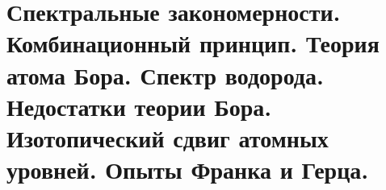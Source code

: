 \chapter{Спектральные закономерности. Комбинационный принцип. Теория 
атома Бора. Спектр водорода. Недостатки теории Бора. Изотопический 
сдвиг атомных уровней. Опыты Франка и Герца.}

\newpage
